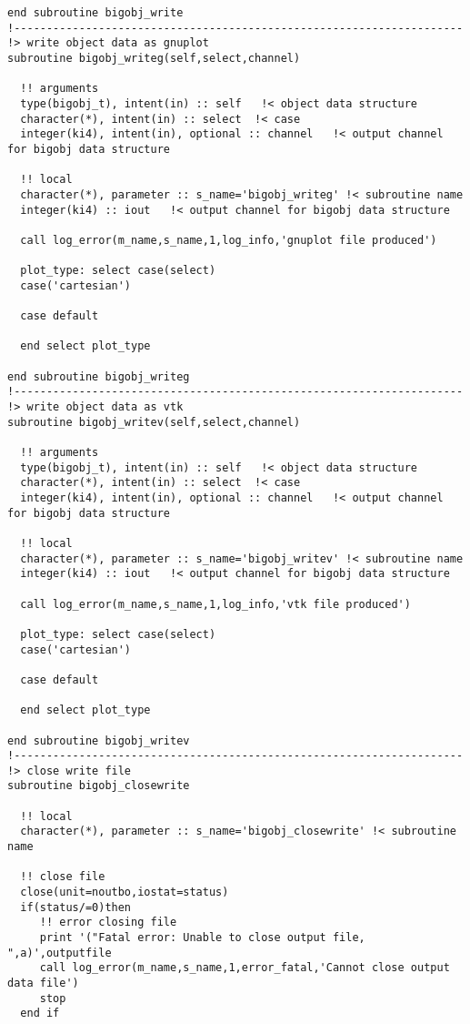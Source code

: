 \begin{verbatim}
end subroutine bigobj_write
!---------------------------------------------------------------------
!> write object data as gnuplot
subroutine bigobj_writeg(self,select,channel)

  !! arguments
  type(bigobj_t), intent(in) :: self   !< object data structure
  character(*), intent(in) :: select  !< case
  integer(ki4), intent(in), optional :: channel   !< output channel for bigobj data structure

  !! local
  character(*), parameter :: s_name='bigobj_writeg' !< subroutine name
  integer(ki4) :: iout   !< output channel for bigobj data structure

  call log_error(m_name,s_name,1,log_info,'gnuplot file produced')

  plot_type: select case(select)
  case('cartesian')

  case default

  end select plot_type

end subroutine bigobj_writeg
!---------------------------------------------------------------------
!> write object data as vtk
subroutine bigobj_writev(self,select,channel)

  !! arguments
  type(bigobj_t), intent(in) :: self   !< object data structure
  character(*), intent(in) :: select  !< case
  integer(ki4), intent(in), optional :: channel   !< output channel for bigobj data structure

  !! local
  character(*), parameter :: s_name='bigobj_writev' !< subroutine name
  integer(ki4) :: iout   !< output channel for bigobj data structure

  call log_error(m_name,s_name,1,log_info,'vtk file produced')

  plot_type: select case(select)
  case('cartesian')

  case default

  end select plot_type

end subroutine bigobj_writev
!---------------------------------------------------------------------
!> close write file
subroutine bigobj_closewrite

  !! local
  character(*), parameter :: s_name='bigobj_closewrite' !< subroutine name

  !! close file
  close(unit=noutbo,iostat=status)
  if(status/=0)then
     !! error closing file
     print '("Fatal error: Unable to close output file, ",a)',outputfile
     call log_error(m_name,s_name,1,error_fatal,'Cannot close output data file')
     stop
  end if


\end{verbatim}
